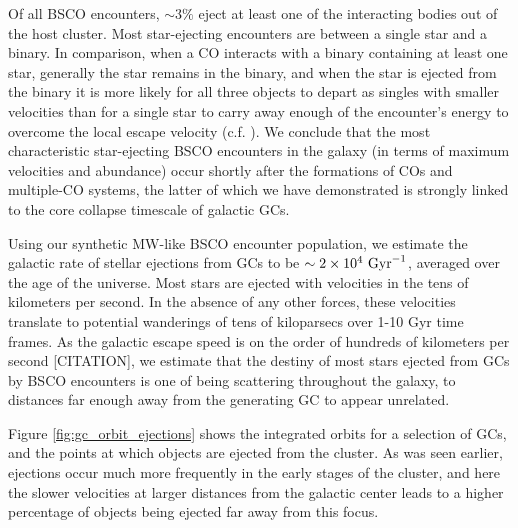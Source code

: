 \documentclass[twocolumn]{aastex631}
\begin{document}
Of all BSCO encounters, $\sim3\%$ eject at least one of the interacting bodies out of the host cluster.
Most star-ejecting encounters are between a single star and a binary.
In comparison, when a CO interacts with a binary containing at least one star, generally the star remains in the binary, and when the star is ejected from the binary it is more likely for all three objects to depart as singles with smaller velocities than for a single star to carry away enough of the encounter's energy to overcome the local escape velocity (c.f. \citet{1983ApJ...268..319H}).
We conclude that the most characteristic star-ejecting BSCO encounters in the galaxy (in terms of maximum velocities and abundance) occur shortly after the formations of COs and multiple-CO systems, the latter of which we have demonstrated is strongly linked to the core collapse timescale of galactic GCs.

Using our synthetic MW-like BSCO encounter population, we estimate the galactic rate of stellar ejections from GCs to be $\sim2 \times 10^4~{\rm Gyr}^{-1}$, averaged over the age of the universe.
Most stars are ejected with velocities in the tens of kilometers per second.
In the absence of any other forces, these velocities translate to potential wanderings of tens of kiloparsecs over 1-10 Gyr time frames.
As the galactic escape speed is on the order of hundreds of kilometers per second [CITATION], we estimate that the destiny of most stars ejected from GCs by BSCO encounters is one of being scattering throughout the galaxy, to distances far enough away from the generating GC to appear unrelated.

Figure \ref{fig:gc_orbit_ejections} shows the integrated orbits for a selection of GCs, and the points at which objects are ejected from the cluster.
As was seen earlier, ejections occur much more frequently in the early stages of the cluster, and here the slower velocities at larger distances from the galactic center leads to a higher percentage of objects being ejected far away from this focus.

\begin{figure*}
    \caption{
        Plots showing the back-integrated orbits for some MW GCs, and the points in the orbit where an object is ejected from the GC.
        The color scale of the points indicates the time of ejection, measured backward from the present day; from the partial monochromism of the data and the density of points for portions of the orbit it can be seen how the ejections are more concentrated earlier in the cluster's evolution and farther away from the galactic center.
    }
    \label{fig:gc_orbit_ejections}
\end{figure*}
\end{document}
